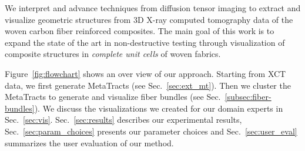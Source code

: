 We interpret and advance techniques from diffusion tensor imaging to extract and visualize geometric structures from 3D X-ray computed tomography data of the woven carbon fiber reinforced composites. The main goal of this work is to expand the state of the art in non-destructive testing through visualization of composite structures in \textit{complete unit cells} of woven fabrics.

Figure~\ref{fig:flowchart} shows an over view of our approach.
Starting from XCT data, we first generate MetaTracts (see Sec.~\ref{sec:ext_mt}). Then we cluster the MetaTracts to generate and visualize fiber bundles (see Sec.~\ref{subsec:fiber-bundles}). We discuss the visualizations we created for our domain experts in Sec.~\ref{sec:vis}. Sec.~\ref{sec:results} describes our experimental results, Sec.~\ref{sec:param_choices} presents our parameter choices and  Sec.~\ref{sec:user_eval} summarizes the user evaluation of our method.
